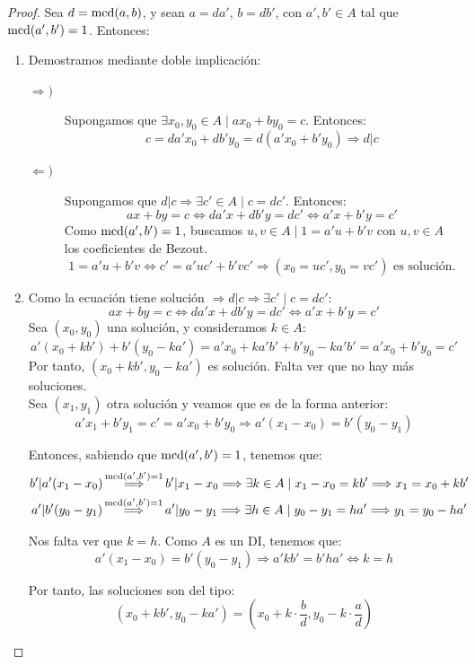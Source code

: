 \begin{proof}
    Sea $d = \operatorname{mcd}(a,b)$, y sean $a = da'$, $b = db'$, con $a',b' \in A$ tal que $\operatorname{mcd}(a', b') = 1$. Entonces:
    \begin{enumerate} 
        \item Demostramos mediante doble implicación:
        \begin{description}
            \item[$\Longrightarrow)$] Supongamos que $\exists x_0, y_0 \in A \mid ax_0 + by_0 = c$. Entonces:
            $$c = da'x_0 + db'y_0 = d(a'x_0 + b'y_0) \Longrightarrow d|c$$

            \item[$\Longleftarrow)$] Supongamos que $d|c \Longrightarrow \exists c' \in A \mid c = dc'$. Entonces:
            $$ax+by=c \Longleftrightarrow da'x+db'y = dc' \Longleftrightarrow a'x+b'y=c'$$
            Como $\operatorname{mcd}(a',b')=1$, buscamos $u, v \in A \mid 1 = a'u + b'v$ con $u,v \in A$ los coeficientes de Bezout.
            $$1=a'u+b'v \Longleftrightarrow c' = a'uc' + b'vc' \Longrightarrow (x_0 = uc', y_0 = vc') \text{ es solución.}$$
        \end{description}

        \item Como la ecuación tiene solución $\Longrightarrow d|c \Longrightarrow \exists c' \mid c=dc'$:
        $$ax+by = c \Longleftrightarrow da'x + db'y = dc' \Longleftrightarrow a'x + b'y = c'$$
        Sea $(x_0, y_0)$ una solución, y consideramos $k \in A$:
        $$a'(x_0 + kb') + b'(y_0-ka') = a'x_0 + ka'b' + b' y_0 - ka'b' = a'x_0 + b'y_0 = c'$$
        Por tanto, $(x_0+kb', y_0-ka')$ es solución. Falta ver que no hay más soluciones.\\
            
        Sea $(x_1, y_1)$ otra solución y veamos que es de la forma anterior:
        $$a'x_1 + b'y_1 = c' = a'x_0 + b'y_0 \Longrightarrow a'(x_1-x_0) = b'(y_0-y_1)$$

        Entonces, sabiendo que $\operatorname{mcd}(a',b')=1$, tenemos que:
        \begin{gather*}
            b'|a'(x_1-x_0) \mathop{\Longrightarrow}^{\operatorname{mcd}(a',b')=1} b'|x_1-x_0 \Longrightarrow \exists k \in A \mid x_1 - x_0 = kb'
            \Longrightarrow x_1 = x_0 + kb' \\ a'|b'(y_0-y_1) \mathop{\Longrightarrow}^{\operatorname{mcd}(a',b')=1} a'|y_0-y_1 \Longrightarrow \exists h \in A \mid y_0 - y_1 = ha'
            \Longrightarrow y_1 = y_0 - ha'
        \end{gather*}
    
        Nos falta ver que $k=h$. Como $A$ es un DI, tenemos que: $$a'(x_1-x_0)=b'(y_0-y_1) \Longrightarrow a'kb' = b'ha' \Longleftrightarrow k = h$$

        Por tanto, las soluciones son del tipo:
        $$(x_0+kb', y_0-ka')=\left(x_0+k\cdot\dfrac{b}{d}, y_0-k\cdot\dfrac{a}{d}\right)$$\qedhere
    \end{enumerate}
\end{proof}

